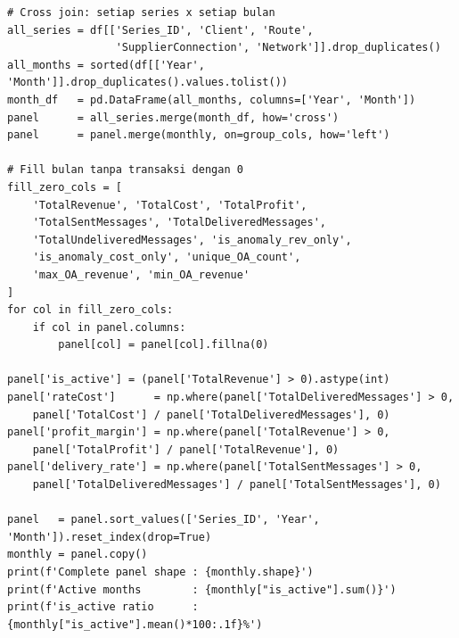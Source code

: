 \begin{lstlisting}[style=pycode,caption={Pembuatan complete panel (cross join series x bulan)}]
# Cross join: setiap series x setiap bulan
all_series = df[['Series_ID', 'Client', 'Route',
                 'SupplierConnection', 'Network']].drop_duplicates()
all_months = sorted(df[['Year', 'Month']].drop_duplicates().values.tolist())
month_df   = pd.DataFrame(all_months, columns=['Year', 'Month'])
panel      = all_series.merge(month_df, how='cross')
panel      = panel.merge(monthly, on=group_cols, how='left')

# Fill bulan tanpa transaksi dengan 0
fill_zero_cols = [
    'TotalRevenue', 'TotalCost', 'TotalProfit',
    'TotalSentMessages', 'TotalDeliveredMessages',
    'TotalUndeliveredMessages', 'is_anomaly_rev_only',
    'is_anomaly_cost_only', 'unique_OA_count',
    'max_OA_revenue', 'min_OA_revenue'
]
for col in fill_zero_cols:
    if col in panel.columns:
        panel[col] = panel[col].fillna(0)

panel['is_active'] = (panel['TotalRevenue'] > 0).astype(int)
panel['rateCost']      = np.where(panel['TotalDeliveredMessages'] > 0,
    panel['TotalCost'] / panel['TotalDeliveredMessages'], 0)
panel['profit_margin'] = np.where(panel['TotalRevenue'] > 0,
    panel['TotalProfit'] / panel['TotalRevenue'], 0)
panel['delivery_rate'] = np.where(panel['TotalSentMessages'] > 0,
    panel['TotalDeliveredMessages'] / panel['TotalSentMessages'], 0)

panel   = panel.sort_values(['Series_ID', 'Year', 'Month']).reset_index(drop=True)
monthly = panel.copy()
print(f'Complete panel shape : {monthly.shape}')
print(f'Active months        : {monthly["is_active"].sum()}')
print(f'is_active ratio      : {monthly["is_active"].mean()*100:.1f}%')
\end{lstlisting}

